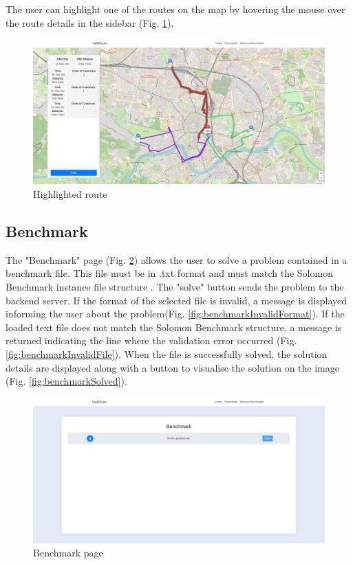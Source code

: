 \documentclass[a4paper,twoside,12pt]{book}
\begin{document}
The user can highlight one of the routes on the map by hovering the mouse over the route details in the sidebar (Fig. \ref{fig:solutionHover}).

\begin{figure}[H]
\centering
\includegraphics[width=\textwidth]{images/solutionHover.jpg}
\caption{Highlighted route}
\label{fig:solutionHover}
\end{figure}

\subsection{Benchmark}

The "Benchmark" page (Fig. \ref{fig:benchmark}) allows the user to solve a problem contained in a benchmark file. This file must be in .txt format and must match the Solomon Benchmark instance file structure \cite{bib:sintefDocumentation}. The "solve" button sends the problem to the backend server. If the format of the selected file is invalid, a message is displayed informing the user about the problem(Fig. \ref{fig:benchmarkInvalidFormat}). If the loaded text file does not match the Solomon Benchmark structure, a message is returned indicating the line where the validation error occurred (Fig. \ref{fig:benchmarkInvalidFile}).  When the file is successfully solved, the solution details are displayed along with a button to visualise the solution on the image (Fig. \ref{fig:benchmarkSolved}).

\begin{figure}[H]
\centering
\includegraphics[width=\textwidth]{images/benchmark.jpg}
\caption{Benchmark page}
\label{fig:benchmark}
\end{figure}
\end{document}
